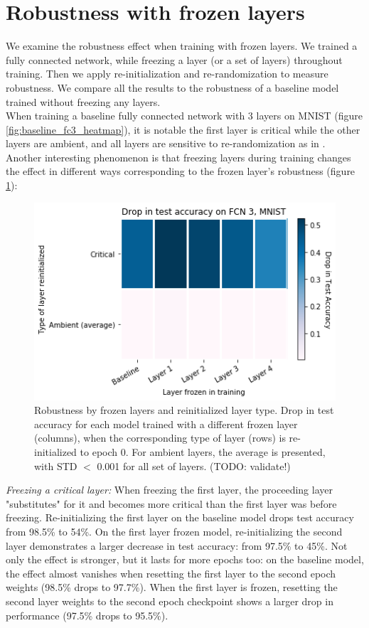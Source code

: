 \documentclass{article}
\begin{document}
\section{Robustness with frozen layers}
We examine the robustness effect when training with frozen layers. We trained a fully connected network, while freezing a layer (or a set of layers) throughout training. Then we apply re-initialization and re-randomization to measure robustness. We compare all the results to the robustness of a baseline model trained without freezing any layers.\\
When training a baseline fully connected network with 3 layers on MNIST (figure \ref{fig:baseline_fc3_heatmap}), it is notable the first layer is critical while the other layers are ambient, and all layers are sensitive to re-randomization as in \cite{allLayers}.\\
Another interesting phenomenon is that freezing layers during training changes the effect in different ways corresponding to the frozen layer's robustness (figure \ref{fig:fc3_drop_by_layer_type}):\\ 
\begin{figure}
  \includegraphics[width=\linewidth]{images/fc3_mnist_drop_in_acc_by_layer.png}
  \caption{Robustness by frozen layers and reinitialized layer type. Drop in test accuracy for each model trained with a different frozen layer (columns), when the corresponding type of layer (rows) is re-initialized to epoch 0. For ambient layers, the average is presented, with STD $<$ 0.001 for all set of layers. (TODO: validate!)}
  \label{fig:fc3_drop_by_layer_type}
\end{figure}
\emph{Freezing a critical layer:} When freezing the first layer, the proceeding layer "substitutes" for it and becomes more critical than the first layer was before freezing. Re-initializing the first layer on the baseline model drops test accuracy from 98.5\% to 54\%. On the first layer frozen model, re-initializing the second layer demonstrates a larger decrease in test accuracy: from 97.5\% to 45\%. Not only the effect is stronger, but it lasts for more epochs too: on the baseline model, the effect almost vanishes when resetting the first layer to the second epoch weights (98.5\% drops to 97.7\%). When the first layer is frozen, resetting the second layer weights to the second epoch checkpoint shows a larger drop in performance (97.5\% drops to 95.5\%).\\
\end{document}
